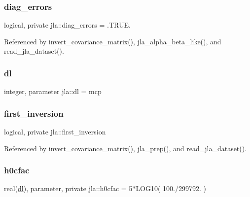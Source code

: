 \mbox{\label{namespacejla_ab5b550ee0d2130dd40e4e517860a32e3}} 
\subsubsection{\texorpdfstring{diag\+\_\+errors}{diag\_errors}}
{\footnotesize\ttfamily logical, private jla\+::diag\+\_\+errors = .T\+R\+U\+E.\hspace{0.3cm}{\ttfamily [private]}}



Referenced by invert\+\_\+covariance\+\_\+matrix(), jla\+\_\+alpha\+\_\+beta\+\_\+like(), and read\+\_\+jla\+\_\+dataset().

\mbox{\label{namespacejla_a3aa6435b4e08f1d532390186ac608741}} 
\subsubsection{\texorpdfstring{dl}{dl}}
{\footnotesize\ttfamily integer, parameter jla\+::dl = mcp}

\mbox{\label{namespacejla_a7e32750158b057376c58db729873f935}} 
\subsubsection{\texorpdfstring{first\+\_\+inversion}{first\_inversion}}
{\footnotesize\ttfamily logical, private jla\+::first\+\_\+inversion\hspace{0.3cm}{\ttfamily [private]}}



Referenced by invert\+\_\+covariance\+\_\+matrix(), jla\+\_\+prep(), and read\+\_\+jla\+\_\+dataset().

\mbox{\label{namespacejla_ac0c65fbeb2a567849038727459759c29}} 
\subsubsection{\texorpdfstring{h0cfac}{h0cfac}}
{\footnotesize\ttfamily real(\mbox{\hyperlink{namespacejla_a3aa6435b4e08f1d532390186ac608741}{dl}}), parameter, private jla\+::h0cfac = 5$\ast$L\+O\+G10( 100./299792. )\hspace{0.3cm}{\ttfamily [private]}}

